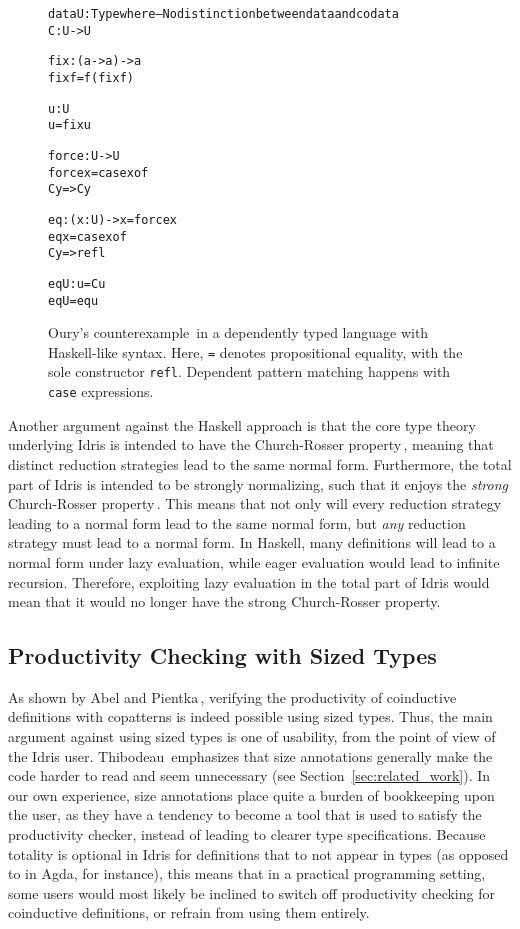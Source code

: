 \begin{figure}
\begin{alltt}
data U : Type where         -- No distinction between data and codata
  C : U -> U

fix : (a -> a) -> a
fix f = f (fix f)

u : U
u = fix u

force : U -> U
force x = case x of
            C y => C y

eq : (x : U) -> x = force x
eq x = case x of
         C y => refl

eqU : u = C u
eqU = eq u
\end{alltt}
\caption{Oury's counterexample\,\citep{OuryCounterexample} in a dependently typed language with Haskell-like syntax. Here, \texttt{=} denotes propositional equality, with the sole constructor \texttt{refl}. Dependent pattern matching happens with \texttt{case} expressions.}
\label{fig:subject_reduction_problem}
\end{figure}

Another argument against the Haskell approach is that the core type theory underlying Idris is intended to have the Church-Rosser property\,\citep{BradyIdrisImpl13}, meaning that distinct reduction strategies lead to the same normal form. Furthermore, the total part of Idris is intended to be strongly normalizing, such that it enjoys the \emph{strong} Church-Rosser property\,\citep{Turner04totalfunctional}. This means that not only will every reduction strategy leading to a normal form lead to the same normal form, but \emph{any} reduction strategy must lead to a normal form. In Haskell, many definitions will lead to a normal form under lazy evaluation, while eager evaluation would lead to infinite recursion. Therefore, exploiting lazy evaluation in the total part of Idris would mean that it would no longer have the strong Church-Rosser property.

\subsection{Productivity Checking with Sized Types}
As shown by Abel and Pientka\,\citep{Abel13Wellfounded}, verifying the productivity of coinductive definitions with copatterns is indeed possible using sized types. Thus, the main argument against using sized types is one of usability, from the point of view of the Idris user. Thibodeau\,\citep{Thibodeau11} emphasizes that size annotations generally make the code harder to read and seem unnecessary (see Section~\ref{sec:related_work}). In our own experience, size annotations place quite a burden of bookkeeping upon the user, as they have a tendency to become a tool that is used to satisfy the productivity checker, instead of leading to clearer type specifications. Because totality is optional in Idris for definitions that to not appear in types (as opposed to in Agda, for instance), this means that in a practical programming setting, some users would most likely be inclined to switch off productivity checking for coinductive definitions, or refrain from using them entirely.

